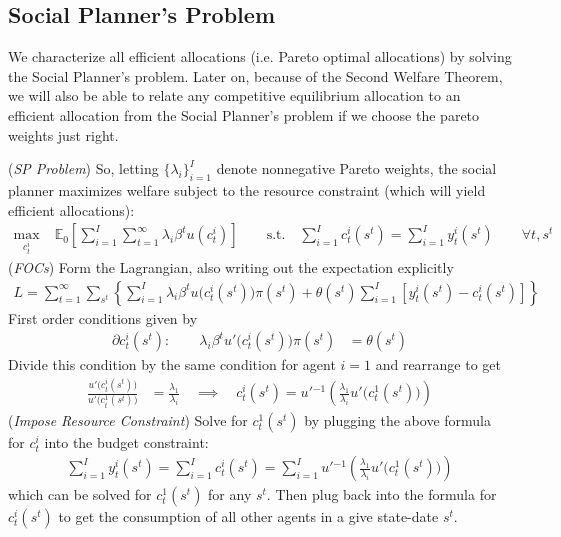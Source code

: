 \documentclass[12pt]{article}
\theoremstyle{plain}
\theoremstyle{definition}
\theoremstyle{remark}
\newcommand{\E}{\mathbb{E}}
\begin{document}
\clearpage
\subsection{Social Planner's Problem}

We characterize all efficient allocations (i.e. Pareto optimal
allocations) by solving the Social Planner's problem.
Later on, because of the Second Welfare Theorem, we will also be able to
relate any competitive equilibrium allocation to an efficient allocation
from the Social Planner's problem if we choose the pareto weights just
right.

(\emph{SP Problem})
So, letting $\{\lambda_i\}_{i=1}^I$ denote nonnegative Pareto weights,
the social planner maximizes welfare subject to the resource constraint
(which will yield efficient allocations):
\begin{align*}
  \max_{c_t^i}
  \;&
  \E_0\left[
    \sum_{i=1}^I
    \sum_{t=1}^\infty
    \lambda_i
    \beta^tu(c_t^i)
  \right]
  \qquad\text{s.t.}\quad
  \sum_{i=1}^I
  c_t^i(s^t)
  =
  \sum_{i=1}^I
  y_t^i(s^t)
  \qquad
  \forall t,s^t
\end{align*}
(\emph{FOCs})
Form the Lagrangian, also writing out the expectation explicitly
\begin{align*}
  L
  =
  \sum_{t=1}^\infty
  \sum_{s^t}
  \left\{
  \sum_{i=1}^I
  \lambda_i
  \beta^tu\big(c_t^i(s^t)\big)\pi(s^t)
  +
  \theta(s^t)
  \sum_{i=1}^I
  [y_t^i(s^t)-c_t^i(s^t)]
  \right\}
\end{align*}
First order conditions given by
\begin{align*}
  \partial c_t^i(s^t):
  \qquad
  \lambda_i
  \beta^t
  u'\big(c_t^i(s^t)\big)\pi(s^t)
  &=
  \theta(s^t)
\end{align*}
Divide this condition by the same condition for agent $i=1$ and
rearrange to get
\begin{align*}
  \frac{u'\big(c_t^i(s^t)\big)}{u'\big(c_t^1(s^t)\big)}
  &=
  \frac{\lambda_1}{\lambda_i}
  \quad\implies\quad
  c_t^i(s^t)
  =
  u'{}^{-1}\left(
    \frac{\lambda_1}{\lambda_i}
    u'\big(c_t^1(s^t)\big)
  \right)
\end{align*}
(\emph{Impose Resource Constraint})
Solve for $c_t^1(s^t)$ by plugging the above formula for $c_t^i$ into
the budget constraint:
\begin{align*}
  \sum_{i=1}^I
  y_t^i(s^t)
  =
  \sum_{i=1}^I
  c_t^i(s^t)
  =
  \sum_{i=1}^I
  u'{}^{-1}\left(
    \frac{\lambda_1}{\lambda_i}
    u'\big(c_t^1(s^t)\big)
  \right)
\end{align*}
which can be solved for $c_t^1(s^t)$ for any $s^t$.
Then plug back into the formula for $c_t^i(s^t)$ to get the consumption
of all other agents in a give state-date $s^t$.
\end{document}
